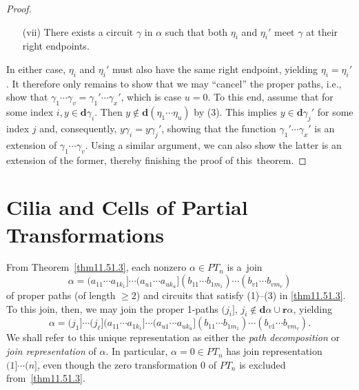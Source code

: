 \documentclass{surv-l}
\numberwithin{equation}{section}
\numberwithin{table}{section}
\numberwithin{figure}{section}
\theoremstyle{plain}
\theoremstyle{definition}
\begin{document}
\begin{proof}
\begin{enumerate}
\item[(vii)] There exists a circuit $\gamma$ in $\alpha$ such that both
$\eta_{i}$ and $\eta_{i}'$ meet $\gamma$ at their right endpoints.
\end{enumerate}
In either case, $\eta_{i}$ and $\eta_{i}'$ must also have the same
right endpoint, yielding $\eta_{i}=\eta_{i}'$. It therefore only
remains to show that we may ``cancel'' the proper paths, i.e.,
show that $\gamma_{1}\cdots\gamma_{v}=\gamma_{1}'\cdots\gamma_{x}'$, which
is case $u=0$. To this end, assume that for some index $i, y\in
\mathbf{d}\gamma_{i}$. Then $y\not\in
\mathbf{d}(\eta_{1}\cdots\eta_{u})$ by (3). This implies $y\in
\mathbf{d}\gamma_{j}'$ for some index $j$ and, consequently,
$y\gamma_{i}=y\gamma_{j}'$, showing that the function
$\gamma_{1}'\cdots\gamma_{x}'$ is an extension of
$\gamma_{1}\cdots\gamma_{v}$. Using a similar argument, we can
also show the latter is an extension of the former, thereby
finishing the proof of this~theorem.
\end{proof}

\section{Cilia and Cells of Partial Transformations}\label{sec11.52}

From Theorem~\ref{thm11.51.3}, each nonzero $\alpha\in PT_{n}$ is
a~join
\[
\alpha=(a_{11}\cdots a_{1k_{1}}]\cdots(a_{u1}\cdots a_{uk_{u}}]
(b_{11}\cdots b_{1m_{1}})\cdots(b_{v1}\cdots b_{vm_{v}})
\]
of proper paths (of length $\geq 2$) and circuits that satisfy
(1)--(3) in \ref{thm11.51.3}. To this join, then, we may join the
proper 1-paths $(j_{i}]$, $j_{i}\not\in \mathbf{d}\alpha\cup
\mathbf{r}\alpha$, yielding
\[
\alpha=(j_{1}]\cdots(j_{\ell}](a_{11}\cdots
a_{1k_{1}}]\cdots(a_{u1}\cdots a_{uk_{u}}](b_{11}\cdots
b_{1m_{1}})\cdots(b_{v1}\cdots b_{vm_{v}}).
\]
We shall refer to this unique representation as either the
\emph{path decomposition} or
\emph{join representation} of $\alpha$. In particular,
$\alpha=0\in PT_{n}$ has join representation $(1]\cdots (n]$, even
though the zero transformation $0$ of $PT_{n}$ is excluded
from~\ref{thm11.51.3}.
\end{document}
